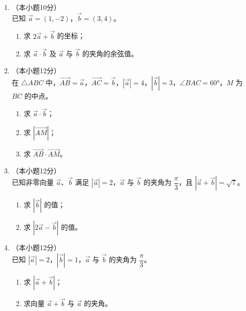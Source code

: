 \documentclass[12pt, a4paper]{ctexart}
\begin{document}
\begin{enumerate}[resume]
\item[17.]（本小题10分）\\
已知 $\vec{a}=(1,-2)$，$\vec{b}=(3,4)$。
\begin{enumerate}[(1)]
  \item 求 $2\vec{a}+\vec{b}$ 的坐标；
  \item 求 $\vec{a}\cdot\vec{b}$ 及 $\vec{a}$ 与 $\vec{b}$ 的夹角的余弦值。
\end{enumerate}

\vspace{6cm}

\item[18.]（本小题12分）\\
在 $\triangle ABC$ 中，$\overrightarrow{AB}=\vec{a}$，$\overrightarrow{AC}=\vec{b}$，$|\vec{a}|=4$，$|\vec{b}|=3$，$\angle BAC=60°$，$M$ 为 $BC$ 的中点。
\begin{enumerate}[(1)]
  \item 求 $\vec{a}\cdot\vec{b}$；
  \item 求 $|\overrightarrow{AM}|$；
  \item 求 $\overrightarrow{AB}\cdot\overrightarrow{AM}$。
\end{enumerate}

\vspace{6cm}

\item[19.]（本小题12分）\\
已知非零向量 $\vec{a}$、$\vec{b}$ 满足 $|\vec{a}|=2$，$\vec{a}$ 与 $\vec{b}$ 的夹角为 $\dfrac{\pi}{3}$，且 $|\vec{a}+\vec{b}|=\sqrt{7}$。
\begin{enumerate}[(1)]
  \item 求 $|\vec{b}|$ 的值；
  \item 求 $|2\vec{a}-\vec{b}|$ 的值。
\end{enumerate}

\vspace{6cm}

\item[20.]（本小题12分）\\
已知 $|\vec{a}|=2$，$|\vec{b}|=1$，$\vec{a}$ 与 $\vec{b}$ 的夹角为 $\dfrac{\pi}{3}$。
\begin{enumerate}[(1)]
  \item 求 $|\vec{a}+\vec{b}|$；
  \item 求向量 $\vec{a}+\vec{b}$ 与 $\vec{a}$ 的夹角。
\end{enumerate}

\vspace{6cm}


\end{enumerate}
\end{document}
